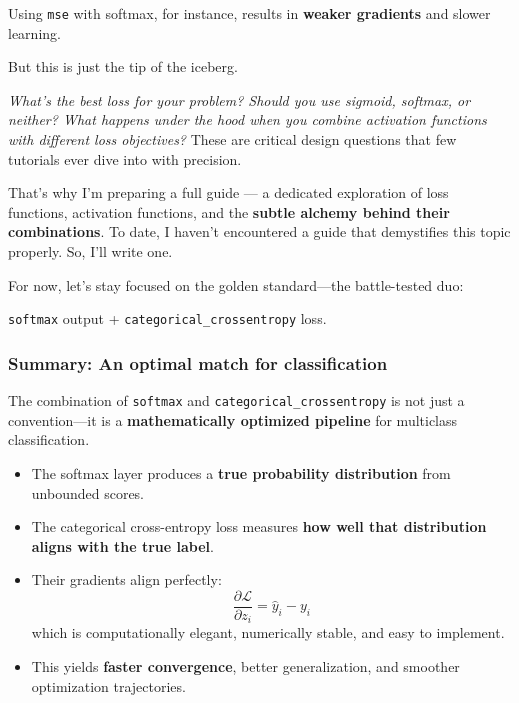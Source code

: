 \documentclass[11pt]{article}
\begin{document}
Using \texttt{mse} with softmax, for instance, results in \textbf{weaker gradients} and slower learning.

\medskip

But this is just the tip of the iceberg.

\vspace{0.5em}
\noindent
\textit{What’s the best loss for your problem? Should you use sigmoid, softmax, or neither? What happens under the hood when you combine activation functions with different loss objectives?}  
These are critical design questions that few tutorials ever dive into with precision.

\vspace{0.5em}
\noindent
That’s why I’m preparing a full guide — a dedicated exploration of loss functions, activation functions, and the \textbf{subtle alchemy behind their combinations}. To date, I haven’t encountered a guide that demystifies this topic properly. So, I’ll write one.

\medskip

\noindent
For now, let’s stay focused on the golden standard—the battle-tested duo:
\begin{center}
\texttt{softmax} output + \texttt{categorical\_crossentropy} loss.
\end{center}


\subsubsection*{Summary: An optimal match for classification}

The combination of \texttt{softmax} and \texttt{categorical\_crossentropy} is not just a convention—it is a \textbf{mathematically optimized pipeline} for multiclass classification.

\begin{itemize}
    \item The softmax layer produces a \textbf{true probability distribution} from unbounded scores.
    \item The categorical cross-entropy loss measures \textbf{how well that distribution aligns with the true label}.
    \item Their gradients align perfectly: 
    \[
    \frac{\partial \mathcal{L}}{\partial z_i} = \hat{y}_i - y_i
    \]
    which is computationally elegant, numerically stable, and easy to implement.
    \item This yields \textbf{faster convergence}, better generalization, and smoother optimization trajectories.
\end{itemize}
\end{document}
